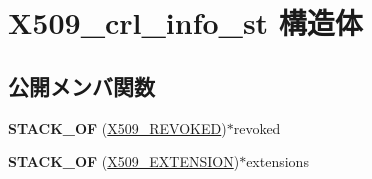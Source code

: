 \hypertarget{struct_x509__crl__info__st}{}\section{X509\+\_\+crl\+\_\+info\+\_\+st 構造体}
\label{struct_x509__crl__info__st}
\subsection*{公開メンバ関数}
\begin{DoxyCompactItemize}
\item 
\hypertarget{struct_x509__crl__info__st_aa3dd132530daea6e1eebbe9d1c05e69b}{}{\bfseries S\+T\+A\+C\+K\+\_\+\+O\+F} (\hyperlink{structx509__revoked__st}{X509\+\_\+\+R\+E\+V\+O\+K\+E\+D})$\ast$revoked\label{struct_x509__crl__info__st_aa3dd132530daea6e1eebbe9d1c05e69b}

\item 
\hypertarget{struct_x509__crl__info__st_aaee1765f67ffd7c5471e0fe3a65f731c}{}{\bfseries S\+T\+A\+C\+K\+\_\+\+O\+F} (\hyperlink{struct_x509__extension__st}{X509\+\_\+\+E\+X\+T\+E\+N\+S\+I\+O\+N})$\ast$extensions\label{struct_x509__crl__info__st_aaee1765f67ffd7c5471e0fe3a65f731c}

\end{DoxyCompactItemize}
